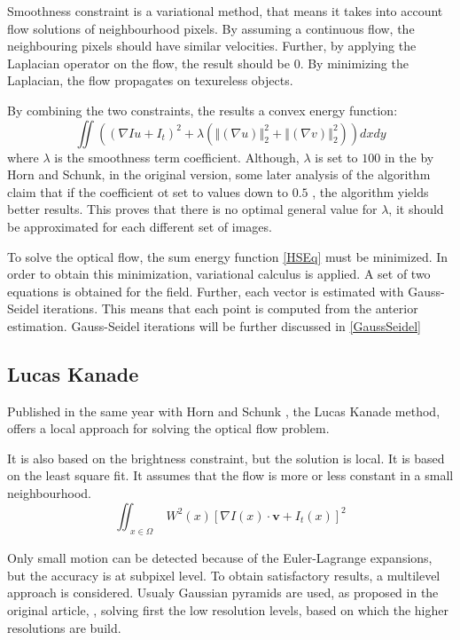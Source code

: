\documentclass[12pt,a4paper,twoside]{report}
\begin{document}
{Smoothness constraint is a variational method, that means it takes into account flow solutions of neighbourhood pixels. By assuming a continuous flow, the neighbouring pixels should have similar velocities\cite{HSOpticalFlow}. Further, by applying the Laplacian operator on the flow, the result should be 0. By minimizing the Laplacian, the flow propagates on texureless objects.

By combining the two constraints, the results a convex energy function:
\begin{equation} \label{HSEq}
	\iint  ((\nabla Iu + I_t)^2 + \lambda(\left\Vert(\nabla u) \right\Vert_2^2 +\left\Vert(\nabla v) \right\Vert_2^2))dxdy
\end{equation}
where $\lambda$ is the smoothness term coefficient. Although, $\lambda$ is set to $100$ in the by Horn and Schunk, in the original version, some later analysis of the algorithm claim that if the coefficient ot set to values down to $0.5$ \cite{barron1994}, the algorithm yields better results. This proves that there is no optimal general value for $\lambda$, it should be approximated for each different set of images.

To solve the optical flow, the sum energy function \ref{HSEq} must be minimized. In order to obtain this minimization, variational calculus is applied. A set of two equations is obtained for the field.
Further, each vector is estimated with Gauss-Seidel iterations. This means that each point is computed from the anterior estimation. Gauss-Seidel iterations will be further discussed in \ref{GaussSeidel}


\subsection{Lucas Kanade}

Published in the same year with Horn and Schunk \cite{HSOpticalFlow}, the Lucas Kanade method\cite{lucas1981}, offers a local approach for solving the optical flow problem. 

It is also based on the brightness constraint, but the solution is local.
It is based on the least square fit. It assumes that the flow is more or less constant in a small neighbourhood. 
\begin{equation} 
\iint_{\substack{x \in \Omega}}
W^2(x)[\nabla I(x)\cdot \boldsymbol{v}+I_t(x)]^2
\end{equation}

Only small motion can be detected because of the Euler-Lagrange expansions, but the accuracy is at subpixel level. To obtain satisfactory results, a multilevel approach is considered. Usualy Gaussian pyramids are used, as proposed in the original article, \cite{lucas1981}, solving first the low resolution levels, based on which the higher resolutions are build. 


}
\end{document}
